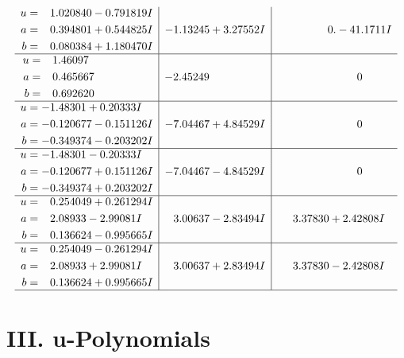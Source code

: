\documentclass[1p]{elsarticle_modified}
\theoremstyle{definition}
\begin{document}
$$\begin{array}{c|c|c}
\begin{aligned}
u &= \phantom{-}1.020840 - 0.791819 I \\
a &= \phantom{-}0.394801 + 0.544825 I \\
b &= \phantom{-}0.080384 + 1.180470 I\end{aligned}
 & -1.13245 + 3.27552 I & \phantom{-0.000000 } 0. - 41.1711 I \\ \hline\begin{aligned}
u &= \phantom{-}1.46097\phantom{ +0.000000I} \\
a &= \phantom{-}0.465667\phantom{ +0.000000I} \\
b &= \phantom{-}0.692620\phantom{ +0.000000I}\end{aligned}
 & -2.45249\phantom{ +0.000000I} & \phantom{-0.000000 } 0 \\ \hline\begin{aligned}
u &= -1.48301 + 0.20333 I \\
a &= -0.120677 - 0.151126 I \\
b &= -0.349374 - 0.203202 I\end{aligned}
 & -7.04467 + 4.84529 I & \phantom{-0.000000 } 0 \\ \hline\begin{aligned}
u &= -1.48301 - 0.20333 I \\
a &= -0.120677 + 0.151126 I \\
b &= -0.349374 + 0.203202 I\end{aligned}
 & -7.04467 - 4.84529 I & \phantom{-0.000000 } 0 \\ \hline\begin{aligned}
u &= \phantom{-}0.254049 + 0.261294 I \\
a &= \phantom{-}2.08933 - 2.99081 I \\
b &= \phantom{-}0.136624 - 0.995665 I\end{aligned}
 & \phantom{-}3.00637 - 2.83494 I & \phantom{-}3.37830 + 2.42808 I \\ \hline\begin{aligned}
u &= \phantom{-}0.254049 - 0.261294 I \\
a &= \phantom{-}2.08933 + 2.99081 I \\
b &= \phantom{-}0.136624 + 0.995665 I\end{aligned}
 & \phantom{-}3.00637 + 2.83494 I & \phantom{-}3.37830 - 2.42808 I\\
 \hline 
 \end{array}$$\newpage
\newpage\renewcommand{\arraystretch}{1}
\centering \section*{ III. u-Polynomials}
\end{document}

